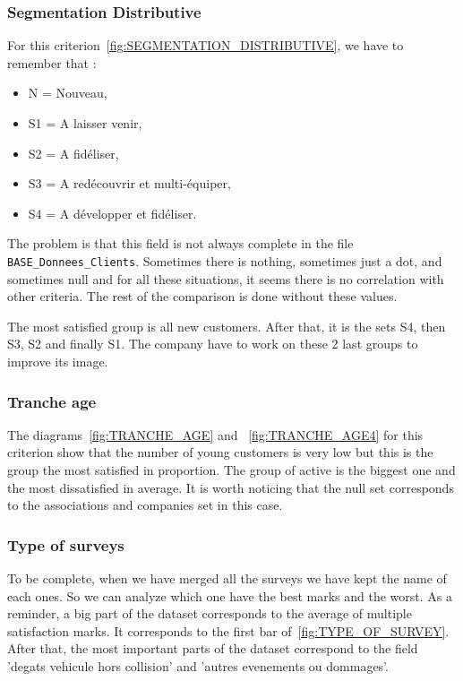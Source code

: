 \documentclass[a4paper, 11pt]{article}
\newcommand{\tw}[1]{\texttt{#1}}
\begin{document}
    \subsubsection{Segmentation Distributive}
    For this criterion~\ref{fig:SEGMENTATION_DISTRIBUTIVE}, we have to remember that :
    \begin{itemize}[noitemsep]
    \item N = Nouveau,
    \item S1 = A laisser venir,
    \item S2 = A fidéliser,
    \item S3 = A redécouvrir et multi-équiper,
    \item S4 = A développer et fidéliser.
    \end{itemize}
    The problem is that this field is not always complete in the file \tw{BASE\_Donnees\_Clients}. Sometimes there is nothing, sometimes just a dot, and sometimes null and for all these situations, it seems there is no correlation with other criteria. The rest of the comparison is done without these values.
    
    The most satisfied group is all new customers. After that, it is the sets S4, then S3, S2 and finally S1. The company have to work on these 2 last groups to improve its image.
    
    \subsubsection{Tranche age}
    The diagrams~\ref{fig:TRANCHE_AGE} and ~\ref{fig:TRANCHE_AGE4} for this criterion show that the number of young customers is very low but this is the group the most satisfied in proportion. The group of active is the biggest one and the most dissatisfied in average. It is worth noticing that the null set corresponds to the associations and companies set in this case.
    
    \subsubsection{Type of surveys}
    To be complete, when we have merged all the surveys we have kept the name of each ones. So we can analyze which one have the best marks and the worst. As a reminder, a big part of the dataset corresponds to the average of multiple satisfaction marks. It corresponds to the first bar of~\ref{fig:TYPE_OF_SURVEY}. After that, the most important parts of the dataset correspond to the field 'degats vehicule hors collision' and 'autres evenements ou dommages'.
    
\end{document}

